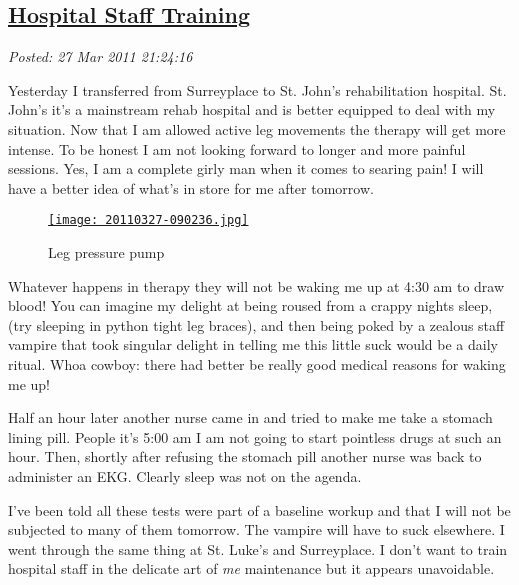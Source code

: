 %

\subsection*{\href{https://bakerjd99.wordpress.com/2011/03/27/hospital-staff-training/}{Hospital Staff Training}}


\noindent\emph{Posted: 27 Mar 2011 21:24:16}
\vspace{6pt}

Yesterday I transferred from Surreyplace to St. John's rehabilitation
hospital. St. John's it's a mainstream rehab hospital and is better
equipped to deal with my situation. Now that I am allowed active leg
movements the therapy will get more intense. To be honest I am not
looking forward to longer and more painful sessions. Yes, I am a
complete girly man when it comes to searing pain! I will have a better
idea of what's in store for me after tomorrow.

\captionsetup[figure]{labelformat=empty}
\begin{figure}
\centering
\href{https://conceptcontrol.smugmug.com/Themes/Diaries/SmugShots/i-Tp8Nq3W/A}{\texttt{[image: 20110327-090236.jpg]}}
\caption{Leg pressure pump}
\label{fig:1241X0}
\end{figure}

Whatever happens in therapy they will not be waking me up at 4:30 am to
draw blood! You can imagine my delight at being roused from a crappy
nights sleep, (try sleeping in python tight leg braces), and then being
poked by a zealous staff vampire that took singular delight in telling
me this little suck would be a daily ritual. Whoa cowboy: there had
better be really good medical reasons for waking me up!

Half an hour later another nurse came in and tried to make me take a
stomach lining pill. People it's 5:00 am I am not going to start
pointless drugs at such an hour. Then, shortly after refusing the
stomach pill another nurse was back to administer an EKG. Clearly sleep
was not on the agenda.

I've been told all these tests were part of a baseline workup and that I
will not be subjected to many of them tomorrow. The vampire will have to
suck elsewhere.
I went through the same thing at St. Luke's and Surreyplace. I don't
want to train hospital staff in the delicate art of \emph{me} maintenance but
it appears unavoidable.





%